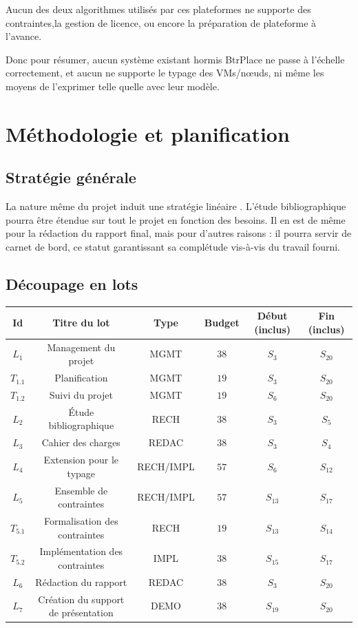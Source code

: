 \documentclass[a4paper]{article}
\begin{document}
Aucun des deux algorithmes utilisés par ces plateformes
ne supporte des contraintes,la gestion de licence, ou encore la
préparation de plateforme à l'avance.

Donc pour résumer, aucun système existant hormis BtrPlace ne passe
à l'échelle correctement, et aucun ne supporte le typage des VMs/nœuds,
ni même les moyens de l'exprimer telle quelle avec leur modèle.

\section{Méthodologie et planification}
\subsection{Stratégie générale}
La nature même du projet induit une stratégie \og linéaire \fg. L'étude
bibliographique pourra être étendue sur tout le projet en fonction
des besoins. Il en est de même pour la rédaction du rapport final, mais
pour d'autres raisons : il pourra servir de carnet de bord, ce
statut garantissant sa complétude vis-à-vis du travail fourni.

\subsection{Découpage en lots}
\begin{center}
\begin{tabular}{c|c|c|c|c|c}
	\textbf{Id} & \textbf{Titre du lot} & \textbf{Type} & \textbf{Budget} & \textbf{Début (inclus)} & \textbf{Fin (inclus)} \\
	\hline
	\hline
	$L_1$ & Management du projet & MGMT & $38$ & $S_3$ & $S_{20}$ \\
	\hline
	$T_{1.1}$ & Planification & MGMT & $19$ & $S_3$ & $S_{20}$ \\
	\hline
	$T_{1.2}$ & Suivi du projet & MGMT & $19$ & $S_6$ & $S_{20}$ \\
	\hline
	$L_2$ & Étude bibliographique & RECH & $38$ & $S_3$ & $S_5$ \\
	\hline
	$L_3$ & Cahier des charges & REDAC & $38$ & $S_3$ & $S_4$ \\
	\hline
	$L_4$ & Extension pour le typage & RECH/IMPL & $57$ & $S_6$ & $S_{12}$ \\
	\hline
	$L_5$ & Ensemble de contraintes & RECH/IMPL & $57$ & $S_{13}$ & $S_{17}$ \\
	\hline
	$T_{5.1}$ & Formalisation des contraintes & RECH & $19$ & $S_{13}$ & $S_{14}$ \\
	\hline
	$T_{5.2}$ & Implémentation des contraintes & IMPL & $38$ & $S_{15}$ & $S_{17}$ \\
	\hline
	$L_6$ & Rédaction du rapport & REDAC & $38$ & $S_3$ & $S_{20}$ \\
	\hline
	$L_7$ & Création du support de présentation & DEMO & $38$ & $S_{19}$ & $S_{20}$ \\
\end{tabular}
\end{center}
\end{document}
